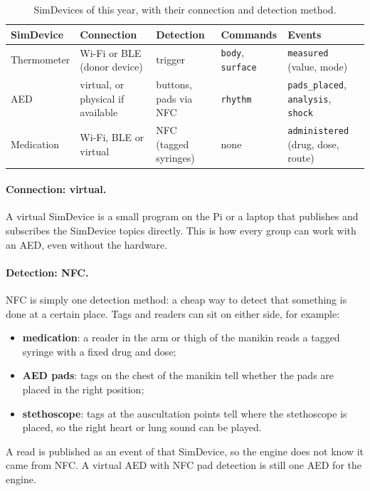 \documentclass[11pt,a4paper]{article}
\begin{document}
\begin{table}[h]
\centering
\small
\begin{tabularx}{\linewidth}{@{}l >{\raggedright\arraybackslash}X >{\raggedright\arraybackslash}X l >{\raggedright\arraybackslash}X@{}}
\toprule
\textbf{SimDevice} & \textbf{Connection} & \textbf{Detection} & \textbf{Commands} & \textbf{Events} \\
\midrule
Thermometer & Wi-Fi or BLE (donor device) & trigger & \texttt{body}, \texttt{surface} & \texttt{measured} (value, mode) \\
AED         & virtual, or physical if available & buttons, pads via NFC & \texttt{rhythm} & \texttt{pads\_placed}, \texttt{analysis}, \texttt{shock} \\
Medication  & Wi-Fi, BLE or virtual & NFC (tagged syringes) & none & \texttt{administered} (drug, dose, route) \\
\bottomrule
\end{tabularx}
\caption{SimDevices of this year, with their connection and detection method.}
\label{tab:simdevices}
\end{table}

\paragraph{Connection: virtual.} A virtual SimDevice is a small program on the
Pi or a laptop that publishes and subscribes the SimDevice topics directly. This
is how every group can work with an AED, even without the hardware.

\paragraph{Detection: NFC.} NFC is simply one detection method: a cheap way to detect that something is
done at a certain place. Tags and readers can sit on either side, for example:
\begin{itemize}
  \item \textbf{medication}: a reader in the arm or thigh of the manikin reads
        a tagged syringe with a fixed drug and dose;
  \item \textbf{AED pads}: tags on the chest of the manikin tell whether the
        pads are placed in the right position;
  \item \textbf{stethoscope}: tags at the auscultation points tell where the
        stethoscope is placed, so the right heart or lung sound can be played.
\end{itemize}
A read is published as an event of that SimDevice, so the engine does not know
it came from NFC. A virtual AED with NFC pad detection is still one AED for the
engine.
\end{document}
